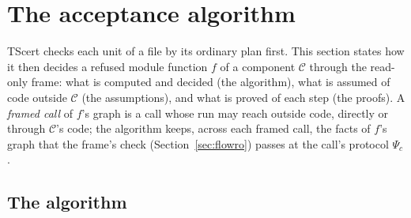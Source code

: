 \documentclass[10pt,a4paper]{article}
\theoremstyle{definition}
\theoremstyle{remark}
\newcommand{\cC}{\mathcal{C}}
\begin{document}
\section{The acceptance algorithm}\label{sec:accept}
\sloppy

TScert checks each unit of a file by its ordinary plan first. This
section states how it then decides a refused module function $f$ of a
component $\cC$ through the read-only frame: what is computed and decided
(the algorithm), what is assumed of code outside $\cC$ (the assumptions),
and what is proved of each step (the proofs). A \emph{framed call} of
$f$'s graph is a call whose run may reach outside code, directly or through
$\cC$'s code; the algorithm keeps, across each framed call, the facts of
$f$'s graph that the frame's check (Section~\ref{sec:flowro}) passes at
the call's protocol $\Psi_c$.

\subsection{The algorithm}\label{sec:accept-alg}
\end{document}
